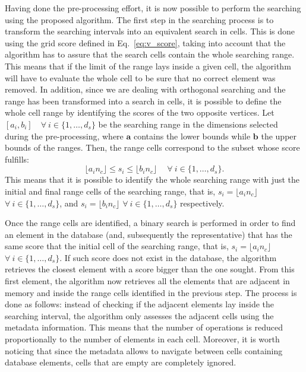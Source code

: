 \documentclass[review]{elsarticle}
\begin{document}
Having done the pre-processing effort, it is now possible to perform the searching using the proposed algorithm. The first step in the searching process is to transform the searching intervals into an equivalent search in cells. This is done using the grid score defined in Eq.~\eqref{eq:v_score}, taking into account that the algorithm has to assure that the search cells contain the whole searching range. This means that if the limit of the range lays inside a given cell, the algorithm will have to evaluate the whole cell to be sure that no correct element was removed. In addition, since we are dealing with orthogonal searching and the range has been transformed into a search in cells, it is possible to define the whole cell range by identifying the scores of the two opposite vertices. Let $[a_i, b_i] \quad \forall \: i\in\{1, \dots, d_s\}$ be the searching range in the dimensions selected during the pre-processing, where $\mathbf{a}$ contains the lower bounds while $\mathbf{b}$ the upper bounds of the ranges. Then, the range cells correspond to the subset whose score fulfills:
\begin{equation}
\lfloor a_in_c \rfloor \leq s_i \leq \lfloor b_in_c \rfloor\ \quad \forall \: i \in \{1,\dots,d_s\}.
\end{equation}
This means that it is possible to identify the whole searching range with just the initial and final range cells of the searching range, that is, $s_i = \lfloor a_in_c \rfloor$ $\forall \: i \in \{1,\dots,d_s\}$, and $s_i = \lfloor b_in_c \rfloor$ $\forall \: i \in \{1,\dots,d_s\}$ respectively.

Once the range cells are identified, a binary search is performed in order to find an element in the database (and, subsequently the representative) that has the same score that the initial cell of the searching range, that is, $s_i = \lfloor a_in_c \rfloor$ $\forall \: i\in\{1,\dots,d_s\}$. If such score does not exist in the database, the algorithm retrieves the closest element with a score bigger than the one sought. From this first element, the algorithm now retrieves all the elements that are adjacent in memory and inside the range cells identified in the previous step. The process is done as follows: instead of checking if the adjacent elements lay inside the searching interval, the algorithm only assesses the adjacent cells using the metadata information. This means that the number of operations is reduced proportionally to the number of elements in each cell. Moreover, it is worth noticing that since the metadata allows to navigate between cells containing database elements, cells that are empty are completely ignored.
\end{document}
